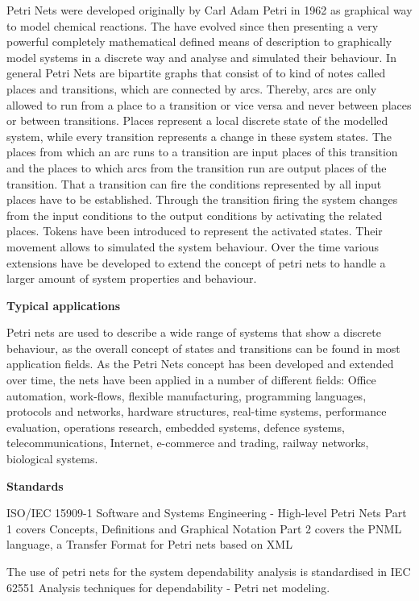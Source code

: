 \documentclass{./template/openetcs_report}
\begin{document}
Petri Nets were developed originally by Carl Adam Petri in 1962 as graphical way to model chemical reactions. The have evolved since then presenting a very powerful completely mathematical defined means of description to graphically model systems in a discrete way and analyse and simulated their behaviour. 
In general Petri Nets are bipartite graphs  that consist of to kind of notes called places and transitions, which are connected by arcs. Thereby, arcs are only allowed to run from a place to a transition or vice versa and never between places or between transitions. Places represent a local discrete state of the modelled system, while every transition represents a change in these system states. The places from which an arc runs to a transition are input places of this transition and the places to which arcs from the transition run are output places of the transition. That a transition can fire the conditions represented by all input places have to be established. Through the transition firing the system changes from the input conditions to the output conditions by activating the related places. Tokens have been introduced to represent the activated states. Their movement allows to simulated the system behaviour. Over the time various extensions have be developed to extend the concept of petri nets to handle a larger amount of system properties and  behaviour. 

	\textbf{Typical applications}

Petri nets are used to describe a wide range of systems that show a discrete behaviour, as the overall concept of states and transitions can be found in most application fields. As the Petri Nets concept has been developed and extended over time, the nets have been applied in a number of different fields: Office automation, work-flows, flexible manufacturing, programming languages, protocols and networks, hardware structures, real-time systems, performance evaluation, operations research, embedded systems, defence systems, telecommunications, Internet, e-commerce and trading, railway networks, biological systems.

	\textbf{Standards}

ISO/IEC 15909-1 Software and Systems Engineering - High-level Petri Nets
Part 1 covers Concepts, Definitions and Graphical Notation
Part 2 covers the PNML language, a Transfer Format for Petri nets based on XML

The use of petri nets for the system dependability analysis is standardised in IEC 62551 Analysis techniques for dependability - Petri net modeling.
\end{document}
